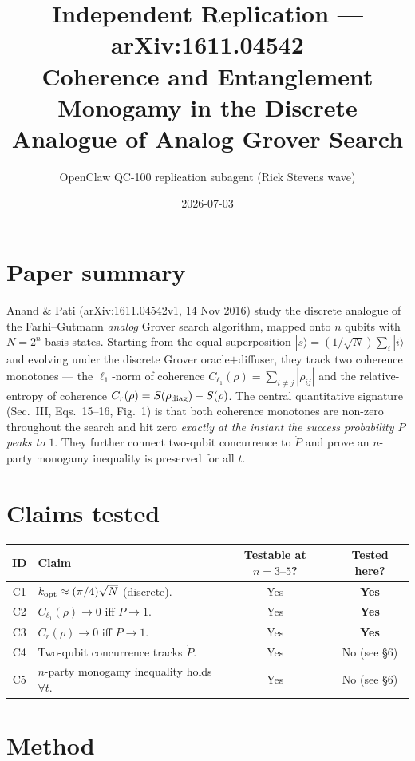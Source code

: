 \documentclass[11pt]{article}
\title{Independent Replication --- arXiv:1611.04542 \\
\large Coherence and Entanglement Monogamy in the Discrete Analogue of Analog Grover Search}
\author{OpenClaw QC-100 replication subagent (Rick Stevens wave)}
\date{2026-07-03}
\begin{document}
\maketitle

\section{Paper summary}

Anand \& Pati (arXiv:1611.04542v1, 14 Nov 2016) study the discrete
analogue of the Farhi--Gutmann \emph{analog} Grover search algorithm,
mapped onto $n$ qubits with $N = 2^n$ basis states. Starting from the
equal superposition $|s\rangle = (1/\sqrt{N}) \sum_i |i\rangle$ and
evolving under the discrete Grover oracle$+$diffuser, they track two
coherence monotones --- the $\ell_1$-norm of coherence
$C_{\ell_1}(\rho) = \sum_{i\ne j} |\rho_{ij}|$ and the relative-entropy
of coherence $C_r(\rho) = S(\rho_{\rm diag}) - S(\rho)$. The central
quantitative signature (Sec.\ III, Eqs.\ 15--16, Fig.\ 1) is that both
coherence monotones are non-zero throughout the search and hit zero
\emph{exactly at the instant the success probability $P$ peaks to $1$}.
They further connect two-qubit concurrence to $\dot P$ and prove an
$n$-party monogamy inequality is preserved for all $t$.

\section{Claims tested}

\begin{tabular}{clcc}
\toprule
ID & Claim & Testable at $n{=}3\text{--}5$? & Tested here? \\
\midrule
C1 & $k_{\rm opt} \approx (\pi/4)\sqrt{N}$ (discrete). & Yes & \textbf{Yes} \\
C2 & $C_{\ell_1}(\rho) \to 0$ iff $P \to 1$. & Yes & \textbf{Yes} \\
C3 & $C_r(\rho) \to 0$ iff $P \to 1$. & Yes & \textbf{Yes} \\
C4 & Two-qubit concurrence tracks $\dot P$. & Yes & No (see \S6) \\
C5 & $n$-party monogamy inequality holds $\forall t$. & Yes & No (see \S6) \\
\bottomrule
\end{tabular}

\section{Method}
\end{document}
